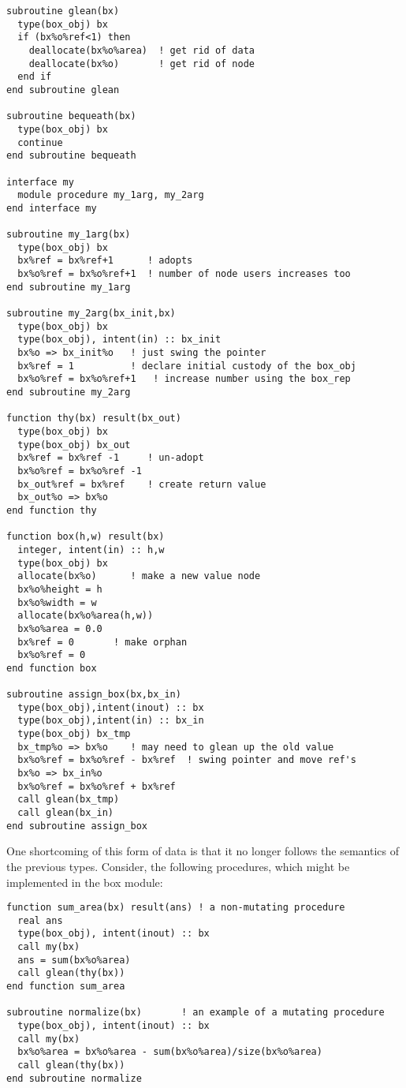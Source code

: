\begin{verbatim}
subroutine glean(bx)
  type(box_obj) bx
  if (bx%o%ref<1) then
    deallocate(bx%o%area)  ! get rid of data
    deallocate(bx%o)       ! get rid of node
  end if
end subroutine glean

subroutine bequeath(bx)
  type(box_obj) bx
  continue
end subroutine bequeath

interface my
  module procedure my_1arg, my_2arg
end interface my

subroutine my_1arg(bx)
  type(box_obj) bx
  bx%ref = bx%ref+1      ! adopts
  bx%o%ref = bx%o%ref+1  ! number of node users increases too
end subroutine my_1arg

subroutine my_2arg(bx_init,bx)
  type(box_obj) bx
  type(box_obj), intent(in) :: bx_init
  bx%o => bx_init%o   ! just swing the pointer
  bx%ref = 1          ! declare initial custody of the box_obj
  bx%o%ref = bx%o%ref+1   ! increase number using the box_rep
end subroutine my_2arg

function thy(bx) result(bx_out)
  type(box_obj) bx
  type(box_obj) bx_out
  bx%ref = bx%ref -1     ! un-adopt
  bx%o%ref = bx%o%ref -1 
  bx_out%ref = bx%ref    ! create return value
  bx_out%o => bx%o
end function thy

function box(h,w) result(bx)
  integer, intent(in) :: h,w
  type(box_obj) bx
  allocate(bx%o)      ! make a new value node
  bx%o%height = h
  bx%o%width = w
  allocate(bx%o%area(h,w))
  bx%o%area = 0.0
  bx%ref = 0       ! make orphan
  bx%o%ref = 0
end function box

subroutine assign_box(bx,bx_in)
  type(box_obj),intent(inout) :: bx
  type(box_obj),intent(in) :: bx_in
  type(box_obj) bx_tmp
  bx_tmp%o => bx%o    ! may need to glean up the old value
  bx%o%ref = bx%o%ref - bx%ref  ! swing pointer and move ref's
  bx%o => bx_in%o
  bx%o%ref = bx%o%ref + bx%ref
  call glean(bx_tmp) 
  call glean(bx_in)
end subroutine assign_box

\end{verbatim}

One shortcoming of this form of data is that it no longer
follows the semantics of the previous types.  Consider, the following
procedures, which might be implemented in the box module:

\begin{verbatim}
function sum_area(bx) result(ans) ! a non-mutating procedure
  real ans
  type(box_obj), intent(inout) :: bx
  call my(bx)
  ans = sum(bx%o%area)
  call glean(thy(bx))
end function sum_area

subroutine normalize(bx)       ! an example of a mutating procedure
  type(box_obj), intent(inout) :: bx
  call my(bx)
  bx%o%area = bx%o%area - sum(bx%o%area)/size(bx%o%area)
  call glean(thy(bx))
end subroutine normalize
\end{verbatim}

